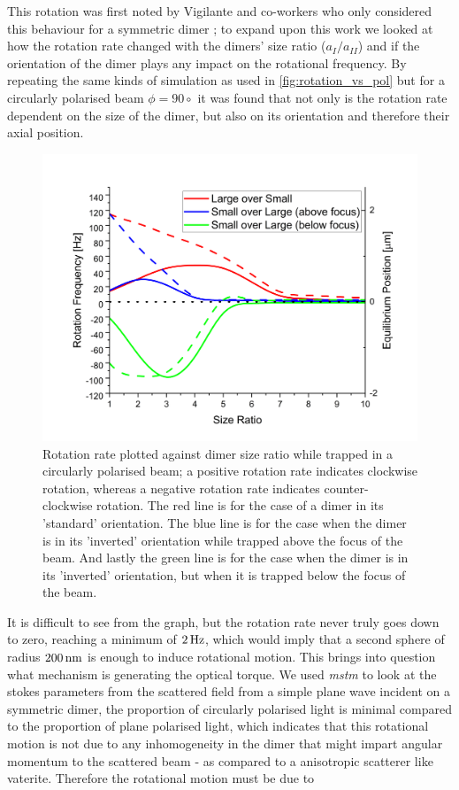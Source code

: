 This rotation was first noted by Vigilante and co-workers who only 
considered this behaviour for a symmetric dimer \cite{Vigilante2020}; 
to expand upon this work we looked at how the rotation rate changed
with the dimers' size ratio ($a_{I}/a_{II}$) and if the orientation
of the dimer plays any impact on the rotational frequency. By repeating
the same kinds of simulation as used in \ref{fig:rotation_vs_pol} but for
a circularly polarised beam $\phi=90\circ$ it was found that not only is 
the rotation rate dependent on the size of the dimer, but also on its 
orientation and therefore their axial position.
\begin{figure}[h!]
  \centering
  \includegraphics[width=\linewidth]{rotation_rate_vs_size.png}
  \caption{Rotation rate plotted against dimer size ratio while trapped in a
  	circularly polarised beam; a positive rotation rate indicates clockwise 
  	rotation, whereas a negative rotation rate indicates counter-clockwise 
  	rotation. The red line is for the case of a dimer in its 'standard' 
  	orientation. The blue line is for the case when the dimer is in its 
  	'inverted' orientation while trapped above the focus of the beam. And 
  	lastly the green line is for the case when the dimer is in its 
  	'inverted' orientation, but when it is trapped below the focus of the 
  	beam.}
\end{figure}

It is difficult to see from the graph, but the rotation rate never
truly goes down to zero, reaching a minimum of $2\,{\rm Hz}$, which would
imply that a second sphere of radius $200\,{\rm nm}$ is enough to
induce rotational motion. This brings into question what mechanism is
generating the optical torque. We used \textit{mstm} to look at the stokes
parameters from the scattered field from a simple plane wave incident
on a symmetric dimer, the proportion of circularly polarised light is 
minimal compared to the proportion of plane polarised light, which 
indicates that this rotational motion is not due to any inhomogeneity 
in the dimer that might impart angular momentum to the scattered beam - 
as compared to a anisotropic scatterer like vaterite. Therefore the 
rotational motion must be due to 

